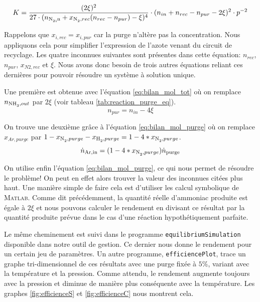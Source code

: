 \[ 
K = 
\frac{({2\xi})^2}{27 \cdot ({{n_{\ce{N2,in}}+x_{\ce{N2},rec}(n_{rec}-n_{pur})-\xi})^4}} \cdot
({n_{in}+n_{rec}-n_{pur}-2\xi})^2 \cdot p^{-2} 
\]

Rappelons que $x_{i,rec}=x_{i,pur}$ car la purge n'altère pas la concentration.
Nous appliquons cela pour simplifier l'expression de l'azote venant du circuit
de recyclage.
Les quatre inconnues suivantes sont présentes dans cette équation: $n_{rec}$, $n_{pur}$, $x_{N2,rec}$ et $\xi$.
Nous avons donc besoin de trois autres équations reliant ces dernières pour pouvoir 
résoudre un système à solution unique.

Une première est obtenue avec l'équation \ref{eq:bilan_mol_tot} où on remplace $n_{\ce{NH3},out}$ par
$2 \xi$ (voir tableau \ref{tab:reaction_purge_eq}).
\[n_{pur}=n_{in}-4 \xi \]

On trouve une deuxième grâce à l'équation \ref{eq:bilan_mol_purge} où on remplace $x_{Ar,purge}$ par $1-x_{\ce{N2},purge}-x_{\ce{H2},purge}=1-4*x_{\ce{N2},purge}$.
\[ \dot{n}_{\ce{Ar},\text{in}}=(1-4*x_{\ce{N2},purge}) \dot{n}_{\text{purge}} \]

On utilise enfin l'équation \ref{eq:bilan_mol_purge}, 
ce qui nous permet de résoudre le problème! On peut en effet alors
trouver la valeur des inconnues citées plus haut.
Une manière simple de faire cela est d'utiliser les calcul symbolique de \textsc{Matlab}. 
Comme dit précédemment, la quantité réelle d'ammoniac produite est égale à $2 \xi$ 
et nous pouvons calculer le rendement en divisant ce résultat
par la quantité produite prévue dans le cas d'une réaction hypothétiquement parfaite.

Le même cheminement est suivi dans le programme \texttt{equilibriumSimulation} 
disponible dans notre outil de gestion. Ce dernier nous donne le rendement pour un
certain jeu de paramètres. Un autre programme, \texttt{efficiencePlot}, trace un graphe
tri-dimensionnel de ces résultats avec une purge fixée à $5\%$,
variant avec la température et la pression. 
Comme attendu, le rendement augmente toujours avec la pression et diminue
de manière plus conséquente avec la température. 
Les graphes \ref{fig:efficienceS} et \ref{fig:efficienceC} nous montrent cela.

